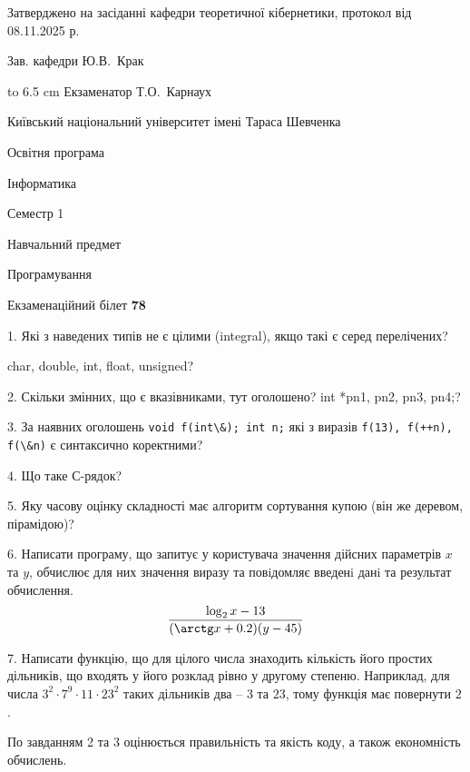 \documentclass[12pt, ukrainian]{article}
\def\code#1{\Verb!#1!}
\begin{document}
{\smallskip\smallskip \begin {scriptsize} Затверджено на засіданні кафедри теоретичної кібернетики, протокол   від   08.11.2025 р.\par\smallskip\smallskip\smallskip\smallskip
{\parbox {6.5 cm} {Зав. кафедри \dotfill Ю.В.~Крак}}\hspace {0.7cm} {\hbox to 6.5 cm { Екзаменатор \dotfill Т.О.~Карнаух}} \end{scriptsize}}
\vspace{0.9cm}
{{\begin {scriptsize}\par
{ \center  Київський національний університет імені Тараса Шевченка \par}
{\parbox {5 cm}{Освітня програма \hfill}{\parbox {7 cm}{Інформатика\hfill}}\parbox {6 cm}{\hfill Семестр 1}}\par
{\parbox {5 cm} {Навчальний предмет \hfill}\parbox {7 cm}{Програмування \hfill}\parbox {6cm}{\hfill}\par}\vspace{-15pt} \end{scriptsize}}{\center Екзаменаційний білет \No \textbf { 78 }\par}}
{%
1. Які з наведених типів не є цілими (integral), якщо такі є серед перелічених?

char, double, int, float, unsigned?
\par
\vspace{2mm}
2. Скільки змінних, що є вказівниками, тут оголошено?
int *pn1, pn2, pn3, pn4;?
\par
\vspace{2mm}
3. За наявних оголошень \code{void f(int\&); int n;} які з виразів \code{f(13), f(++n), f(\&n)} є синтаксично коректними?
\par
\vspace{2mm}
4. Що таке С-рядок?
\par
\vspace{2mm}
5. Яку часову оцінку складності має алгоритм сортування купою (він же деревом, пірамідою)?
\par
\vspace{2mm}
6. Написати програму, що запитує у користувача значення дійсних параметрів $x$ та $y$, обчислює для них значення виразу та повiдомляє введенi данi та результат обчислення.
$$\frac{\log_{2} x - 13}{(\arctg x + 0.2) (y - 45)}$$ 

\par
7. Написати функцію, що для цілого числа знаходить кількість його простих дільників, що входять у його розклад рівно у другому степеню. Наприклад, для числа $3^2{\cdot}7^9{\cdot}11{\cdot}23^{2}$ таких дільників два – $3$ та $23$, тому функція має повернути $2$.

По завданням 2 та 3 оцінюється правильність та якість коду, а також економність обчислень.

}
\end{document}
